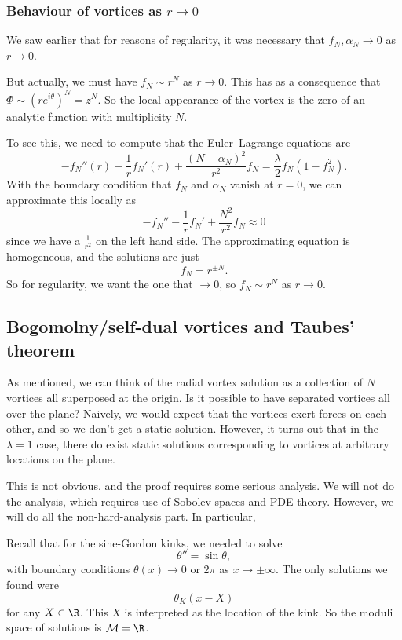 \documentclass[a4paper]{article}
\begin{document}
\subsubsection*{Behaviour of vortices as $r \to 0$}
We saw earlier that for reasons of regularity, it was necessary that $f_N, \alpha_N \to 0$ as $r \to 0$.

But actually, we must have $f_N \sim r^N$ as $r \to 0$. This has as a consequence that $\Phi \sim (r e^{i\theta})^N = z^N$. So the local appearance of the vortex is the zero of an analytic function with multiplicity $N$.

To see this, we need to compute that the Euler--Lagrange equations are
\[
  -f_N''(r) - \frac{1}{r} f_N'(r) + \frac{(N - \alpha_N)^2}{r^2} f_N = \frac{\lambda}{2} f_N(1 - f_N^2).
\]
With the boundary condition that $f_N$ and $\alpha_N$ vanish at $r = 0$, we can approximate this locally as
\[
  - f_N'' - \frac{1}{r} f_N' + \frac{N^2}{r^2} f_N \approx 0
\]
since we have a $\frac{1}{r^2}$ on the left hand side. The approximating equation is homogeneous, and the solutions are just
\[
  f_N = r^{\pm N}.
\]
So for regularity, we want the one that $\to 0$, so $f_N \sim r^N$ as $r \to 0$.

\subsection{Bogomolny/self-dual vortices and Taubes' theorem}
As mentioned, we can think of the radial vortex solution as a collection of $N$ vortices all superposed at the origin. Is it possible to have separated vortices all over the plane? Naively, we would expect that the vortices exert forces on each other, and so we don't get a static solution. However, it turns out that in the $\lambda = 1$ case, there do exist static solutions corresponding to vortices at arbitrary locations on the plane.

This is not obvious, and the proof requires some serious analysis. We will not do the analysis, which requires use of Sobolev spaces and PDE theory. However, we will do all the non-hard-analysis part. In particular, %

Recall that for the sine-Gordon kinks, we needed to solve
\[
  \theta'' = \sin \theta,
\]
with boundary conditions $\theta(x) \to 0$ or $2\pi$ as $x \to \pm \infty$. The only solutions we found were
\[
  \theta_K (x - X)
\]
for any $X \in \R$. This $X$ is interpreted as the location of the kink. So the moduli space of solutions is $\mathcal{M} = \R$.
\end{document}
